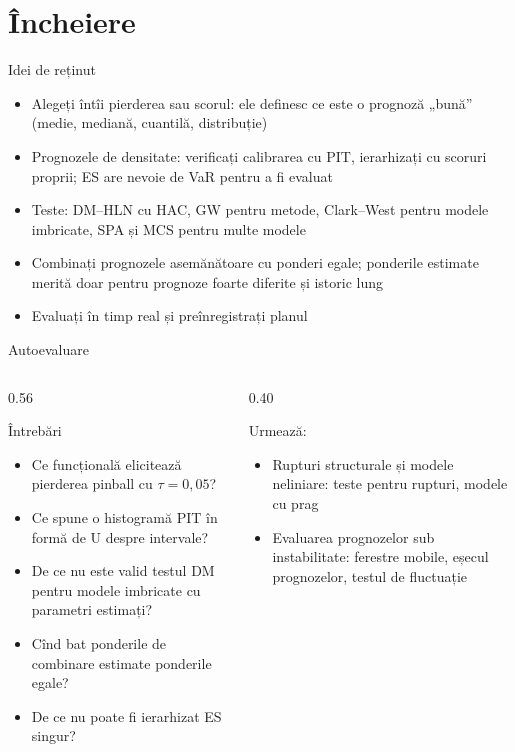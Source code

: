 \section{Încheiere}

\begin{frame}{Idei de reținut}
\itemsize{\small}
\begin{itemize}
    \item Alegeți întîi pierderea sau scorul: ele definesc ce este o prognoză „bună” (medie, mediană, cuantilă, distribuție)
    \item Prognozele de densitate: verificați calibrarea cu PIT, ierarhizați cu scoruri proprii; ES are nevoie de VaR pentru a fi evaluat
    \item Teste: DM--HLN cu HAC, GW pentru metode, Clark--West pentru modele imbricate, SPA și MCS pentru multe modele
    \item Combinați prognozele asemănătoare cu ponderi egale; ponderile estimate merită doar pentru prognoze foarte diferite și istoric lung
    \item Evaluați în timp real și preînregistrați planul
\end{itemize}
\end{frame}

\begin{frame}{Autoevaluare}
\itemsize{\small}
\begin{columns}[T]
\begin{column}{0.56\textwidth}
\begin{block}{Întrebări}
\begin{itemize}
    \item Ce funcțională elicitează pierderea pinball cu $\tau = 0{,}05$?
    \item Ce spune o histogramă PIT în formă de U despre intervale?
    \item De ce nu este valid testul DM pentru modele imbricate cu parametri estimați?
    \item Cînd bat ponderile de combinare estimate ponderile egale?
    \item De ce nu poate fi ierarhizat ES singur?
\end{itemize}
\end{block}
\end{column}
\begin{column}{0.40\textwidth}
\begin{block}{Urmează: }
\begin{itemize}
    \item Rupturi structurale și modele neliniare: teste pentru rupturi, modele cu prag
    \item Evaluarea prognozelor sub instabilitate: ferestre mobile, eșecul prognozelor, testul de fluctuație 
\end{itemize}
\end{block}
\end{column}
\end{columns}
\end{frame}


